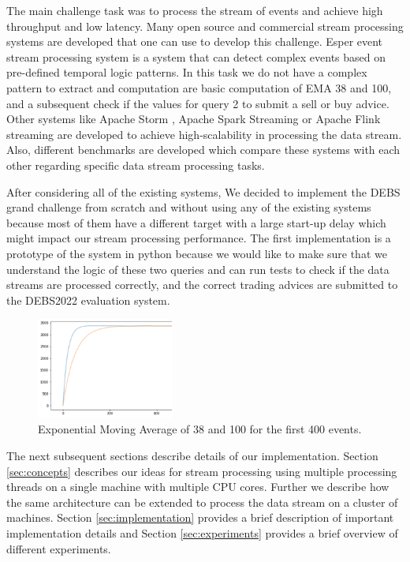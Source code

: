 The main challenge task was to process the stream of events and achieve high throughput and low latency. 
Many open source and commercial stream processing systems are developed that one can use to develop this challenge. 
Esper event stream processing system \cite{Bernhardt2007} is a system that can detect complex events based on pre-defined temporal logic patterns. 
In this task we do not have a complex pattern to extract and computation are basic computation of EMA 38 and 100, and a subsequent check if the values for 
query 2 to submit a sell or buy advice. Other systems like Apache Storm \cite{8288619}, Apache Spark Streaming \cite{zaharia2010spark} or 
Apache Flink streaming \cite{alexandrov2014stratosphere} are developed to achieve high-scalability in processing the data stream. 
Also, different benchmarks are developed \cite{DBLP:conf/cloud/SikdarTJ17} \cite{8701904} which compare these systems with each other regarding specific data 
stream processing tasks. 

After considering all of the existing systems, We decided to implement the DEBS grand challenge from scratch and without using any of the existing systems 
because most of them have a different target with a large start-up delay which might impact our stream processing performance. The first implementation is a 
prototype of the system in python because we would like to make sure that we understand the logic of these two queries and can run tests to check if the 
data streams are processed correctly, and the correct trading advices are submitted to the DEBS2022 evaluation system. 



\begin{figure}[!ht]
    \begin{center}
        \includegraphics[width=0.4\textwidth]{./images/query2_example_200.png}
        \caption{Exponential Moving Average of 38 and 100 for the first 400 events.}
        \label{fig:EMA200}
    \end{center}
\end{figure}


The next subsequent sections describe details of our implementation. Section \ref{sec:concepts} describes our ideas for 
stream processing using multiple processing threads on a single machine with multiple CPU cores. Further we describe how the same 
architecture can be extended to process the data stream on a cluster of machines.  Section \ref{sec:implementation} provides 
a brief description of important implementation details and Section \ref{sec:experiments} provides a brief overview of different 
experiments. 

